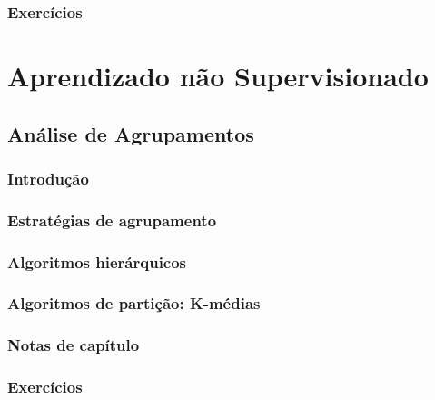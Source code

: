 \documentclass[
]{latex/krantz}
\theoremstyle{definition}
\theoremstyle{definition}
\theoremstyle{definition}
\theoremstyle{definition}
\theoremstyle{remark}
\begin{document}
\hypertarget{exercuxedcios-10}{%
\section{Exercícios}\label{exercuxedcios-10}}

\hypertarget{part-aprendizado-nuxe3o-supervisionado}{%
\part{Aprendizado não Supervisionado}\label{part-aprendizado-nuxe3o-supervisionado}}

\hypertarget{anuxe1lise-de-agrupamentos}{%
\chapter{Análise de Agrupamentos}\label{anuxe1lise-de-agrupamentos}}

\hypertarget{introduuxe7uxe3o-11}{%
\section{Introdução}\label{introduuxe7uxe3o-11}}

\hypertarget{estratuxe9gias-de-agrupamento}{%
\section{Estratégias de agrupamento}\label{estratuxe9gias-de-agrupamento}}

\hypertarget{algoritmos-hieruxe1rquicos}{%
\section{Algoritmos hierárquicos}\label{algoritmos-hieruxe1rquicos}}

\hypertarget{algoritmos-de-partiuxe7uxe3o-k-muxe9dias}{%
\section{Algoritmos de partição: K-médias}\label{algoritmos-de-partiuxe7uxe3o-k-muxe9dias}}

\hypertarget{notas-de-capuxedtulo-11}{%
\section{Notas de capítulo}\label{notas-de-capuxedtulo-11}}

\hypertarget{exercuxedcios-11}{%
\section{Exercícios}\label{exercuxedcios-11}}
\end{document}
